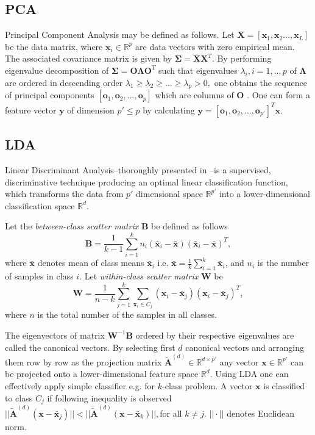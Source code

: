 \documentclass[]{article}
\newcommand{\vecb}[1]{\mathbf{#1}}
\newcommand{\matb}[1]{\mathbf{#1}}
\newcommand{\R}{\mathbb{R}}
\begin{document}
\subsection{PCA}
Principal Component Analysis \cite{Wall:2003} may be defined as follows. 
Let 
$\mathbf{X}=[\mathbf{x}_1,\mathbf{x}_2\ldots,\mathbf{x}_L]$
be the data matrix, where $\mathbf{x}_i\in\R^{p}$ are data vectors with zero
empirical mean. The associated covariance matrix is given by
$\mathbf{\Sigma}=\mathbf{X}\mathbf{X}^T$. 
By performing eigenvalue decomposition of 
$\mathbf{\Sigma}=\mathbf{O}\mathbf{\Lambda}\mathbf{O}^T$ such that 
eigenvalues  $\lambda_i, i=1,..,p$ of $\mathbf{\Lambda}$ are ordered in 
descending order
$\lambda_1\geq\lambda_2\geq\ldots\geq\lambda_p>0,$
one obtains the sequence of principal components 
$[\mathbf{o}_{1},\mathbf{o}_{2},\ldots,\mathbf{o}_{p}]$ which are columns of 
$\mathbf{O}$ \cite{Wall:2003}.
One can form a feature vector $\mathbf{y}$ of dimension $p'\leq p$ by 
calculating 
$\mathbf{y} = [\mathbf{o}_{1},\mathbf{o}_{2},\ldots,\mathbf{o}_{p'}]^T \mathbf{x}.$
\subsection{LDA} \label{LDA}
Linear Discriminant Analysis--thoroughly presented in
\cite{Koronacki:2005}--is a supervised, discriminative technique producing an
optimal linear classification function, which transforms the data from
$p'$ dimensional space
$\mathbb{R}^{p'}$ into a lower-dimensional classification space $\R^d$.

Let the \emph{between-class scatter matrix} $\matb{B}$ be defined as follows
\begin{equation*}
\mathbf{B}=\frac{1}{k-1}
\sum_{i=1}^k 
n_i(\bar{\vecb{x}}_i-\bar{\vecb{x}})(\bar{\vecb{x}}_i-\bar{\vecb{x}})^T,
\end{equation*}
where $\bar{\vecb{x}}$ denotes mean of class means $\bar{\vecb{x}}_i$ i.e.	
$\bar{\vecb{x}}=\frac{1}{k}\sum_{i=1}^k \bar{\vecb{x}}_i$, and $n_i$ is the 
number of samples in class $i$. 
Let \emph{within-class scatter matrix} $\mathbf{W}$ be
\begin{equation*}
\mathbf{W}=\frac{1}{n-k}\sum_{j=1}^k \sum_{\vecb{x}_i\in C_j} 
(\vecb{x}_i-\bar{\vecb{x}}_j)(\vecb{x}_i-\bar{\vecb{x}}_j)^T,
\end{equation*}
where $n$ is the total number of the samples in all classes.

The eigenvectors of matrix $\matb{W}^{-1}\matb{B}$ ordered by their respective
eigenvalues are called the canonical vectors. By selecting first $d$ canonical
vectors and arranging them row by row as the projection matrix 
$\tilde{\mathbf{A}}^{(d)}\in
\R^{d\times p'}$ any vector $\vecb{x}\in \R^{p'}$ can be projected onto a
lower-dimensional feature space ${\mathbb{R}^d}$. Using LDA one can effectively 
apply simple classifier e.g. for $k$-class problem. A vector $\vecb{x}$ is 
classified to class $C_j$ if following inequality is observed 
$
||\tilde{\matb{A}}^{(d)} (\vecb{x} - \bar{\vecb{x}}_j)||<
||\tilde{\matb{A}}^{(d)} (\vecb{x} - \bar{\vecb{x}}_k)||,
\label{id:equation:classification_mc}
$for all $k\neq j$. $||\cdot||$ denotes Euclidean norm.
\end{document}
